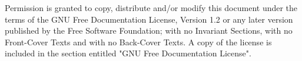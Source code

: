 
\small{Permission is granted to copy, distribute and/or modify this document
    under the terms of the GNU Free Documentation License, Version 1.2
    or any later version published by the Free Software Foundation;
    with no Invariant Sections, with no Front-Cover Texts and with no
    Back-Cover Texts. A copy of the license is included in the section
    entitled "GNU Free Documentation License".}

